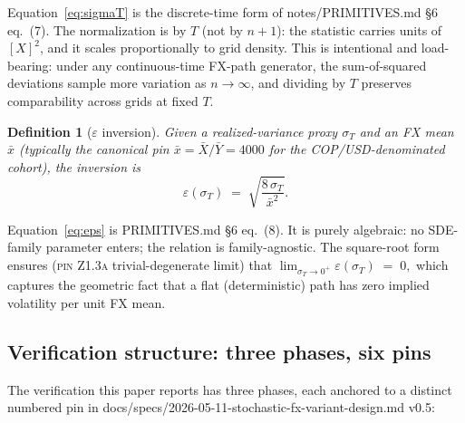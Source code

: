 \documentclass[11pt,letterpaper]{article}
\newtheorem{definition}{Definition}[section]
\newcommand{\sigmaT}{\sigma_{T}}
\newcommand{\epsT}{\varepsilon(\sigmaT)}
\newcommand{\xbar}{\bar{x}}
\newcommand{\PinZ}[1]{\textsc{pin Z1.#1}}
\begin{document}
Equation~\eqref{eq:sigmaT} is the discrete-time form of
\textsf{notes/PRIMITIVES.md} \S6 eq.~(7). The normalization is by $T$
(not by $n+1$): the statistic carries units of $[X]^{2}$, and it scales
proportionally to grid density. This is intentional and load-bearing:
under any continuous-time FX-path generator, the sum-of-squared
deviations sample more variation as $n \to \infty$, and dividing by $T$
preserves comparability across grids at fixed $T$.

\begin{definition}[$\varepsilon$ inversion]
\label{def:eps}
Given a realized-variance proxy $\sigmaT$ and an FX mean $\xbar$
(typically the canonical pin $\xbar = \bar{X}/\bar{Y} = 4000$ for the
COP/USD-denominated cohort), the inversion is
\begin{equation}
    \epsT \;=\; \sqrt{\frac{8\,\sigmaT}{\xbar^{2}}}.
    \label{eq:eps}
\end{equation}
\end{definition}

Equation~\eqref{eq:eps} is \textsf{PRIMITIVES.md} \S6 eq.~(8). It is
purely algebraic: no SDE-family parameter enters; the relation is
family-agnostic. The square-root form ensures (\PinZ{3a} trivial-degenerate
limit) that
\(
    \lim_{\sigmaT \to 0^{+}} \epsT \;=\; 0,
\)
which captures the geometric fact that a flat (deterministic) path has
zero implied volatility per unit FX mean.

\subsection{Verification structure: three phases, six pins}
\label{sec:framework:phases}

The verification this paper reports has three phases, each anchored to a
distinct numbered pin in
\textsf{docs/specs/2026-05-11-stochastic-fx-variant-design.md} v0.5:
\end{document}
